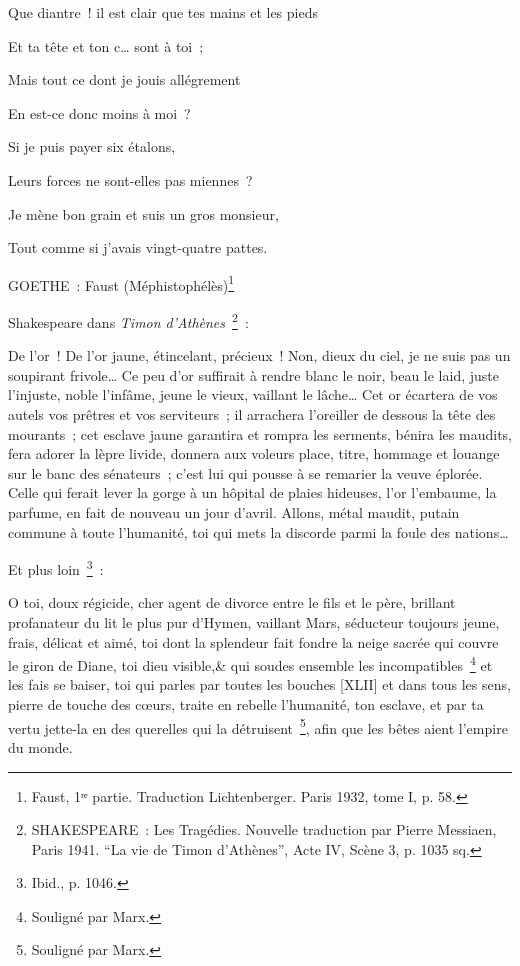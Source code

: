 \documentclass[french,twoside]{book} %
\newenvironment{quoteblock}%
  {\begin{quoting}}
  {\end{quoting}}
\newenvironment{quotebar}{%
    \def\FrameCommand{{\color{rubric!10!}\vrule width 0.5em} \hspace{0.9em}}%
    \def\OuterFrameSep{\itemsep} %
    \MakeFramed {\advance\hsize-\width \FrameRestore}
  }%
  {%
    \endMakeFramed
  }
\renewenvironment{quoteblock}%
  {%
    \savenotes
    \setstretch{0.9}
    \normalfont
    \begin{quotebar}
  }
  {%
    \end{quotebar}
    \spewnotes
  }
\begin{document}
\begin{quoteblock}
 \noindent Que diantre ! il est clair que tes mains et les pieds\par
 Et ta tête et ton c… sont à toi ;\par
 Mais tout ce dont je jouis allégrement\par
 En est-ce donc moins à moi ?\par
 Si je puis payer six étalons,\par
 Leurs forces ne sont-elles pas miennes ?\par
 Je mène bon grain et suis un gros monsieur,\par
 Tout comme si j’avais vingt-quatre pattes.\par
 GOETHE : Faust (Méphistophélès)\footnote{Faust, 1ʳᵉ partie. Traduction Lichtenberger. Paris 1932, tome I, p. 58.}
 \end{quoteblock}

\noindent Shakespeare dans \emph{Timon d’Athènes} \footnote{SHAKESPEARE : Les Tragédies. Nouvelle traduction par Pierre Messiaen, Paris 1941. “La vie de Timon d’Athènes”, Acte IV, Scène 3, p. 1035 sq.} :\par

\begin{quoteblock}
 \noindent De l’or ! De l’or jaune, étincelant, précieux ! Non, dieux du ciel, je ne suis pas un soupirant frivole… Ce peu d’or suffirait à rendre blanc le noir, beau le laid, juste l’injuste, noble l’infâme, jeune le vieux, vaillant le lâche… Cet or écartera de vos autels vos prêtres et vos serviteurs ; il arrachera l’oreiller de dessous la tête des mourants ; cet esclave jaune garantira et rompra les serments, bénira les maudits, fera adorer la lèpre livide, donnera aux voleurs place, titre, hommage et louange sur le banc des sénateurs ; c’est lui qui pousse à se remarier la veuve éplorée. Celle qui ferait lever la gorge à un hôpital de plaies hideuses, l’or l’embaume, la parfume, en fait de nouveau un jour d’avril. Allons, métal maudit, putain commune à toute l’humanité, toi qui mets la discorde parmi la foule des nations…
 \end{quoteblock}

\noindent Et plus loin \footnote{Ibid., p. 1046.} :\par

\begin{quoteblock}
 \noindent O toi, doux régicide, cher agent de divorce entre le fils et le père, brillant profanateur du lit le plus pur d’Hymen, vaillant Mars, séducteur toujours jeune, frais, délicat et aimé, toi dont la splendeur fait fondre la neige sacrée qui couvre le giron de Diane, toi dieu visible,\& qui soudes ensemble les incompatibles \footnote{Souligné par Marx.} et les fais se baiser, toi qui parles par toutes les bouches [XLII] et dans tous les sens, pierre de touche des cœurs, traite en rebelle l’humanité, ton esclave, et par ta vertu jette-la en des querelles qui la détruisent \footnote{Souligné par Marx.}, afin que les bêtes aient l’empire du monde.
 \end{quoteblock}
\end{document}
